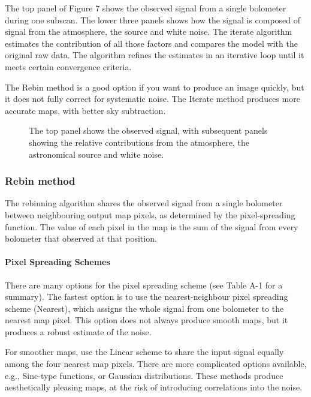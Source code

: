 \documentclass[twoside,11pt]{article}
\renewcommand{\_}{\texttt{\symbol{95}}}
\begin{document}
The top panel of Figure 7 shows the observed signal from a single
bolometer during one subscan. The lower three panels shows how the
signal is composed of signal from the atmosphere, the source and white
noise. The iterate algorithm estimates the contribution of all those
factors and compares the model with the original raw data. The
algorithm refines the estimates in an iterative loop until it meets
certain convergence criteria.

The Rebin method is a good option if you want to produce an image
quickly, but it does not fully correct for systematic noise. The
Iterate method produces more accurate maps, with better sky
subtraction.

\begin{figure}
\caption{The top panel shows the observed signal, with subsequent
  panels showing the relative contributions from the atmosphere, the
  astronomical source and white noise.}
\end{figure}

\subsubsection{Rebin method}

The rebinning algorithm shares the observed signal from a single
bolometer between neighbouring output map pixels, as determined by the
pixel-spreading function. The value of each pixel in the map is the
sum of the signal from every bolometer that observed at that position.

\paragraph{Pixel Spreading Schemes}

There are many options for the pixel spreading scheme (see Table A-1
for a summary). The fastest option is to use the nearest-neighbour
pixel spreading scheme (Nearest), which assigns the whole signal from
one bolometer to the nearest map pixel. This option does not always
produce smooth maps, but it produces a robust estimate of the noise.

For smoother maps, use the Linear scheme to share the input signal
equally among the four nearest map pixels. There are more complicated
options available, e.g., Sinc-type functions, or Gaussian
distributions. These methods produce aesthetically pleasing maps, at
the risk of introducing correlations into the noise.
\end{document}
